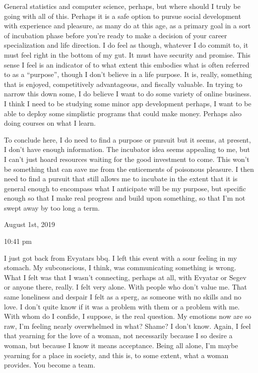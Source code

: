 General statistics and computer science, perhaps, but where should I
truly be going with all of this. Perhaps it is a safe option to pursue
social development with experience and pleasure, as many do at this age,
as a primary goal in a sort of incubation phase before you're ready to
make a decision of your career specialization and life direction. I do
feel as though, whatever I do commit to, it must feel right in the
bottom of my gut. It must have security and promise. This sense I feel
is an indicator of to what extent this embodies what is often referred
to as a ``purpose'', though I don't believe in a life purpose. It is,
really, something that is enjoyed, competitively advantageous, and
fiscally valuable. In trying to narrow this down some, I do believe I
want to do some variety of online business. I think I need to be
studying some minor app development perhaps, I want to be able to deploy
some simplistic programs that could make money. Perhaps also doing
courses on what I learn.

To conclude here, I do need to find a purpose or pursuit but it seems,
at present, I don't have enough information. The incubator idea seems
appealing to me, but I can't just hoard resources waiting for the good
investment to come. This won't be something that can save me from the
enticements of poisonous pleasure. I then need to find a pursuit that
still allows me to incubate in the extent that it is general enough to
encompass what I anticipate will be my purpose, but specific enough so
that I make real progress and build upon something, so that I'm not
swept away by too long a term.

\bigskip
\bigskip
August 1st, 2019

10:41 pm

I just got back from Evyatars bbq. I left this event with a sour feeling
in my stomach. My subconscious, I think, was communicating something is
wrong. What I felt was that I wasn't connecting, perhaps at all, with
Evyatar or Segev or anyone there, really. I felt very alone. With people
who don't value me. That same loneliness and despair I felt as a sperg,
as someone with no skills and no love. I don't quite know if it was a
problem with them or a problem with me. With whom do I confide, I
suppose, is the real question. My emotions now are so raw, I'm feeling
nearly overwhelmed in what? Shame? I don't know. Again, I feel that
yearning for the love of a woman, not necessarily because I so desire a
woman, but because I know it means acceptance. Being all alone, I'm
maybe yearning for a place in society, and this is, to some extent, what
a woman provides. You become a team.

